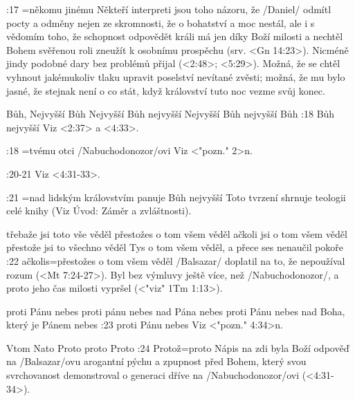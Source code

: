 :17 {}={někomu jinému} Někteří interpreti jsou toho názoru, že \x/Daniel/ odmítl pocty a odměny nejen ze skromnosti, že o bohatství a moc nestál, ale i s vědomím toho, že schopnost odpovědět králi má jen díky Boží milosti a nechtěl Bohem svěřenou roli zneužít k osobnímu prospěchu (srv. <Gn 14:23>). Nicméně jindy podobné dary bez problémů přijal (<2:48>; <5:29>). Možná, že se chtěl vyhnout jakémukoliv tlaku upravit poselství nevítané zvěsti; možná, že mu bylo jasné, že stejnak není o co stát, když království tuto noc vezme svůj konec.
     
    {Bůh, Nejvyšší}   %
    {Bůh Nejvyšší}   %
    {Bůh nejvyšší}   %
    {Nejvyšší Bůh}   %
    {nejvyšší Bůh}   %
:18 {Bůh nejvyšší}   Viz <2:37> a  <4:33>.     
     
:18 {}={tvému otci \x/Nabuchodonozor/ovi}   Viz <"pozn." 2>n.
     
:20-21 {} Viz  <4:31-33>.     
     
:21 {}={nad lidským královstvím panuje Bůh nejvyšší} Toto tvrzení shrnuje teologii celé knihy (Viz Úvod: Záměr a zvláštnosti).     
     
    {třebaže jsi toto vše věděl}   %
    {přestožes o tom všem věděl}   %
    {ačkoli jsi o tom všem věděl}   %
    {přestože jsi to všechno věděl}   %
    {Tys o tom všem věděl, a přece ses nenaučil pokoře}   %
:22 {ačkolis}={přestožes o tom všem věděl} \x/Balsazar/ doplatil na to, že nepoužíval rozum  (<Mt 7:24-27>). Byl bez výmluvy ještě více, než \x/Nabuchodonozor/, a proto jeho čas milosti vypršel  (<"viz" 1Tm 1:13>).     
     
     
    {proti Pánu nebes} %
    {proti pánu nebes}  %
    {nad Pána nebes} %
    {proti Pánu nebes}  %
    {nad Boha, který je Pánem nebes}  %
:23 {proti Pánu nebes}  Viz <"pozn." 4:34>n.     

    {Vtom}   %
    {Nato}   %
    {Proto}   %
    {proto}   %
    {Proto}   %
:24 {Protož}={proto} Nápis na zdi byla Boží odpověď na \x/Balsazar/ovu arogantní pýchu a zpupnost před Bohem, který svou svrchovanost demonstroval o generaci dříve na \x/Nabuchodonozor/ovi  (<4:31-34>).     
     
